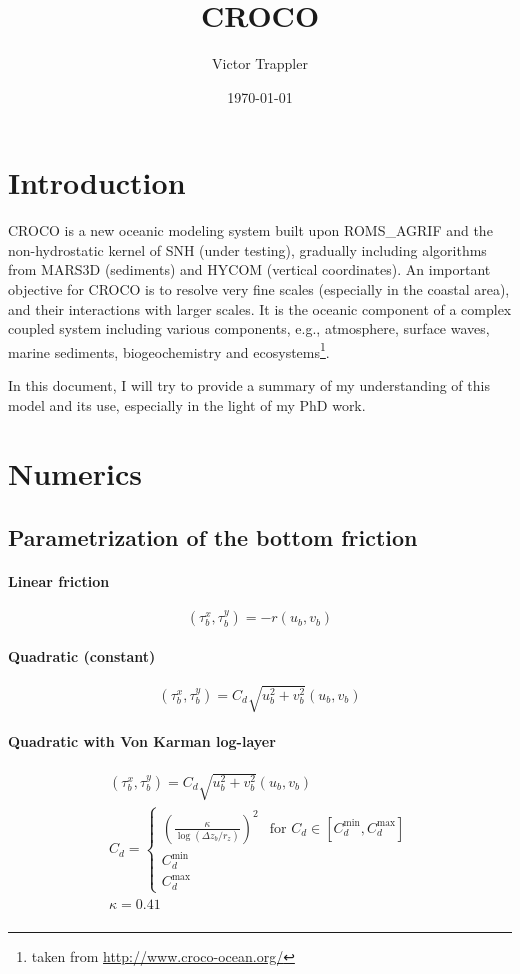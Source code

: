 \documentclass{article}
\author{Victor Trappler}
\title{CROCO}
\date{\today}
\begin{document}
\maketitle

\section*{Introduction}

CROCO is a new oceanic modeling system built upon ROMS\_AGRIF and the
non-hydrostatic kernel of SNH (under testing), gradually including
algorithms from MARS3D (sediments) and HYCOM (vertical
coordinates). An important objective for CROCO is to resolve very fine
scales (especially in the coastal area), and their interactions with
larger scales. It is the oceanic component of a complex coupled system
including various components, e.g., atmosphere, surface waves, marine
sediments, biogeochemistry and ecosystems\footnote{taken from
  \url{http://www.croco-ocean.org/}}.

In this document, I will try to provide a summary of my understanding
of this model and its use, especially in the light of my PhD work.
\section{Numerics}
\subsection{Parametrization of the bottom friction}
\paragraph{Linear friction}
\begin{equation}
  \label{eq:linear_friction}
  (\tau_b^x, \tau_b^y) = -r (u_b, v_b)
\end{equation}
\paragraph{Quadratic (constant)}
\begin{equation}
  \label{eq:quadratic_friction_constant}
  (\tau_b^x, \tau_b^y) = C_d \sqrt{u_b^2 + v_b^2}(u_b, v_b)
\end{equation}
\paragraph{Quadratic with Von Karman log-layer}
\begin{align}
  \label{eq:quadratic_friction_vonkarman}
  (\tau_b^x, \tau_b^y) = C_d \sqrt{u_b^2 + v_b^2}(u_b, v_b) \\  
  C_d = \left\{\begin{array}{ll}
                 {\left(\frac{\kappa}{\log({\Delta z_b}/{r_z})}\right)}^2 & \text{for } C_d \in [C_d^{\min}, C_d^{\max}] \\
                 C_d^{\min} & \\
                 C_d^{\max}
       \end{array}
  \right. \\
  \kappa=0.41 \\  
\end{align}
\end{document}
